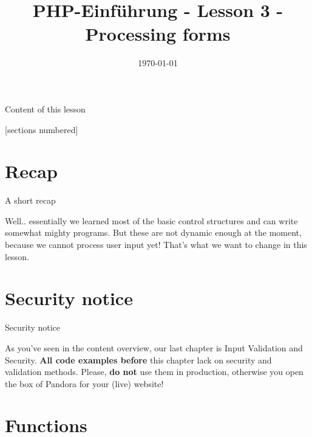 


\newcommand{\topic}{
	PHP-Einführung - Lesson 3 - Processing forms
}

\title{\topic}
\date{\today}



\maketitle

\begin{frame}{Content of this lesson}

	[sections numbered]
	\tableofcontents

\end{frame}

\section{Recap}

\begin{frame}{A short recap}

	Well.. essentially we learned most of the basic control structures and can write somewhat mighty programs. \pause But these are not dynamic enough at the moment, because we cannot process user input yet! That's what we want to change in this lesson.
\end{frame}

\section{Security notice}

\begin{frame}{Security notice}

	As you've seen in the content overview, our last chapter is Input Validation and Security. \textbf{All code examples before} this chapter lack on security and validation methods. \pause 
	Please, \textbf{do not} use them in production, otherwise you open the box of Pandora for your (live) website!
\end{frame}

\section{Functions}

